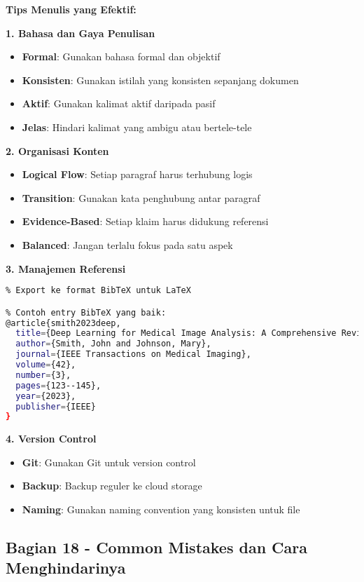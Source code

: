 \textbf{Tips Menulis yang Efektif:}

\textbf{1. Bahasa dan Gaya Penulisan}
\begin{itemize}
    \item \textbf{Formal}: Gunakan bahasa formal dan objektif
    \item \textbf{Konsisten}: Gunakan istilah yang konsisten sepanjang dokumen
    \item \textbf{Aktif}: Gunakan kalimat aktif daripada pasif
    \item \textbf{Jelas}: Hindari kalimat yang ambigu atau bertele-tele
\end{itemize}

\textbf{2. Organisasi Konten}
\begin{itemize}
    \item \textbf{Logical Flow}: Setiap paragraf harus terhubung logis
    \item \textbf{Transition}: Gunakan kata penghubung antar paragraf
    \item \textbf{Evidence-Based}: Setiap klaim harus didukung referensi
    \item \textbf{Balanced}: Jangan terlalu fokus pada satu aspek
\end{itemize}

\textbf{3. Manajemen Referensi}
\begin{lstlisting}[language=bash, style=bash, caption=Tips Manajemen Referensi]
% Gunakan tools seperti Mendeley atau Zotero
% Export ke format BibTeX untuk LaTeX

% Contoh entry BibTeX yang baik:
@article{smith2023deep,
  title={Deep Learning for Medical Image Analysis: A Comprehensive Review},
  author={Smith, John and Johnson, Mary},
  journal={IEEE Transactions on Medical Imaging},
  volume={42},
  number={3},
  pages={123--145},
  year={2023},
  publisher={IEEE}
}
\end{lstlisting}

\textbf{4. Version Control}
\begin{itemize}
    \item \textbf{Git}: Gunakan Git untuk version control
    \item \textbf{Backup}: Backup reguler ke cloud storage
    \item \textbf{Naming}: Gunakan naming convention yang konsisten untuk file
\end{itemize}

\subsection*{Bagian 18 - Common Mistakes dan Cara Menghindarinya}

